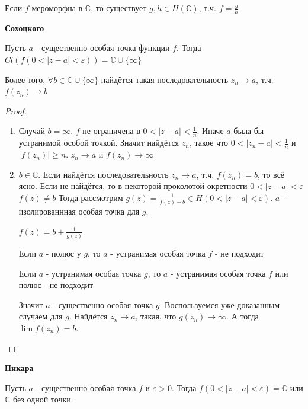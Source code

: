 \begin{statement}
    Если $f$ мероморфна в $\mathbb{C}$, то существует $g, h \in H(\mathbb{C})$, т.ч. $f = \frac{g}{h}$
\end{statement}

\begin{theorem}
    \textbf{Сохоцкого}

    Пусть $a$ - существенно особая точка функции $f$. Тогда $Cl \left(f(0 < |z - a| < \varepsilon)\right) = \mathbb{C} \cup \{ \infty \}$

    Более того, $\forall b \in \mathbb{C} \cup \{ \infty \}$ найдётся такая последовательность
    $z_n \rightarrow a$, т.ч. $f(z_n) \rightarrow b$
\end{theorem}

\begin{proof}
    \begin{enumerate}
        \item Случай $b = \infty$. $f$ не ограничена в $0 < |z - a| < \frac{1}{n}$. Иначе $a$ была бы устранимой особой точкой.
        Значит найдётся $z_n$, такое что $0 < |z_n - a| < \frac{1}{n}$ и $|f(z_n)| \geqslant n$.
        $z_n \rightarrow a$ и $f(z_n) \rightarrow \infty$
        \item $b \in \mathbb{C}$. Если найдётся последовательность $z_n \rightarrow a$, т.ч. $f(z_n) = b$, то всё ясно.
        Если не найдётся, то в некоторой проколотой окретности $0 < |z - a| < \varepsilon $ $f(z) \neq b$
        Тогда рассмотрим $g(z) = \frac{1}{f(z) - b} \in H(0 < |z - a| < \varepsilon)$.
        $a$ - изолированнная особая точка для $g$.

        $f(z) = b + \frac{1}{g(z)}$

        Если $a$ - полюс у $g$, то $a$ - устранимая особая точка $f$ - не подходит

        Если $a$ - устранимая особая точка $g$, то $a$ - устранимая особая точка $f$ или полюс - не подходит

        Значит $a$ - существенно особая точка $g$. Воспользуемся уже доказанным случаем для $g$.
        Найдётся $z_n \rightarrow a$, такая, что $g(z_n) \rightarrow \infty$. А тогда
        $\lim f(z_n) = b$.
    \end{enumerate}
\end{proof}

\begin{theorem}
    \textbf{Пикара}

    Пусть $a$ - существенно особая точка $f$ и $\varepsilon > 0$. Тогда
    $f(0 < |z - a| < \varepsilon) = \mathbb{C}$ или $\mathbb{C}$ без одной точки.
\end{theorem}

